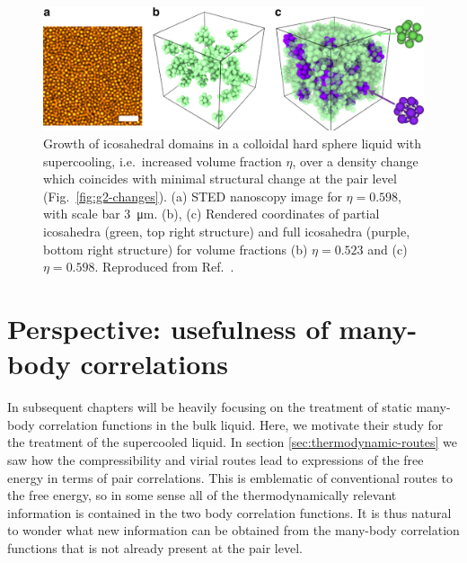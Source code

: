\documentclass[11pt,twoside]{report}
\begin{document}

\begin{figure}
  \includegraphics[width=\linewidth,outer]{icosahedra-hallett}
  \caption[Growth of icosahedral domains in the supercooled hard sphere liquid]{
    Growth of icosahedral domains in a colloidal hard sphere liquid with supercooling, i.e.\ increased volume fraction $\eta$, over a density change which coincides with minimal structural change at the pair level (Fig.\ \ref{fig:g2-changes}).
    (a) STED nanoscopy image for $\eta = 0.598$, with scale bar \SI{3}{\micro\meter}.
    (b), (c) Rendered coordinates of partial icosahedra (green, top right structure) and full icosahedra (purple, bottom right structure) for volume fractions (b) $\eta = 0.523$ and (c) $\eta = 0.598$.
    Reproduced from Ref.\ \cite{HallettNC2018}.
  }
  \label{fig:icosahedral-domains}
\end{figure}

\section{Perspective: usefulness of many-body correlations}
\label{sec:correlation-perspective}

In subsequent chapters will be heavily focusing on the treatment of static many-body correlation functions in the bulk liquid.
Here, we motivate their study for the treatment of the supercooled liquid.
In section \ref{sec:thermodynamic-routes} we saw how the compressibility and virial routes lead to expressions of the free energy in terms of pair correlations.
This is emblematic of conventional routes to the free energy, so in some sense all of the thermodynamically relevant information is contained in the two body correlation functions.
It is thus natural to wonder what new information can be obtained from the many-body correlation functions that is not already present at the pair level.
\end{document}
